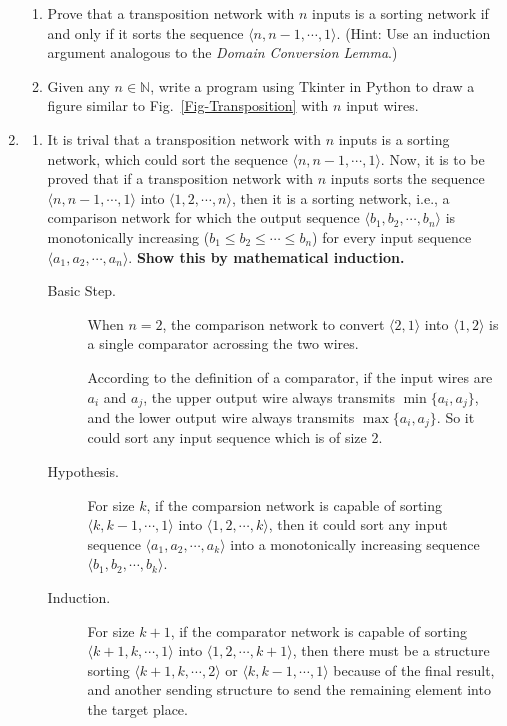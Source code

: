 \documentclass[12pt,a4paper]{article}
\makeatletter
\newtheorem*{solution}{Solution}
\theoremstyle{definition}
\renewenvironment{solution}[1][Solution] {\par\pushQED{\qed}\normalfont\topsep6\p@\@plus6\p@\relax\trivlist\item[\hskip\labelsep\bfseries#1\@addpunct{.}]\ignorespaces}{\popQED\endtrivlist\@endpefalse} \makeatother
\makeatother
\begin{document}
\begin{enumerate}
\begin{enumerate}
\item Prove that a transposition network with $n$ inputs is a sorting network if and only if it sorts the sequence $\langle n, n-1, \cdots, 1 \rangle$. {\color{blue}(Hint: Use an induction argument analogous to the \emph{Domain Conversion Lemma}.)}
\item {\color{red}{(Optional Sub-question with Bonus)}} Given any $n \in \mathbb{N}$, write a program using Tkinter in Python to draw a figure similar to Fig.~\ref{Fig-Transposition} with $n$ input wires.
\end{enumerate}
\begin{solution}
    \begin{enumerate}
        \item It is trival that a transposition network with $n$ inputs is a sorting network, which could sort the sequence $\langle n, n-1, \cdots, 1 \rangle$. Now, it is to be proved that if a transposition network with $n$ inputs sorts the sequence $\langle n, n-1, \cdots, 1 \rangle$ into $\langle 1,2, \cdots, n\rangle$, then it is a sorting network, i.e., a comparison network for which the output sequence $\langle b_1, b_2, \cdots, b_n \rangle$ is monotonically increasing ($b_1\leq b_2 \leq \cdots \leq b_n$) for every input sequence $\langle a_1, a_2, \cdots, a_n \rangle$. \textbf{Show this by mathematical induction.}
        \begin{description}
            \item[Basic Step.] When $n=2$, the comparison network to convert $\langle 2,1\rangle$ into $\langle 1,2\rangle$ is a single comparator acrossing the two wires.
             
             

            According to the definition of a comparator, if the input wires are $a_i$ and $a_j$, the upper output wire always transmits $\min\{a_i,a_j\}$, and the lower output wire always transmits $\max\{a_i,a_j\}$. So it could sort any input sequence which is of size 2.
            \item[Hypothesis.] For size $k$, if the comparsion network is capable of sorting $\langle k,k-1,\cdots,1\rangle$ into $\langle 1,2,\cdots, k\rangle$, then it could sort any input sequence $\langle a_1,a_2,\cdots,a_k\rangle$ into a monotonically increasing sequence $\langle b_1,b_2,\cdots,b_k\rangle$.
            \item[Induction.] For size $k+1$, if the comparator network is capable of sorting $\langle k+1,k,\cdots,1\rangle$ into $\langle 1,2,\cdots,k+1\rangle$, then there must be a structure sorting $\langle k+1,k,\cdots, 2\rangle$ or $\langle k,k-1,\cdots,1\rangle$ because of the final result, and another sending structure to send the remaining element into the target place. 
            

\end{description}
\end{enumerate}
\end{solution}
\end{enumerate}
\end{document}

